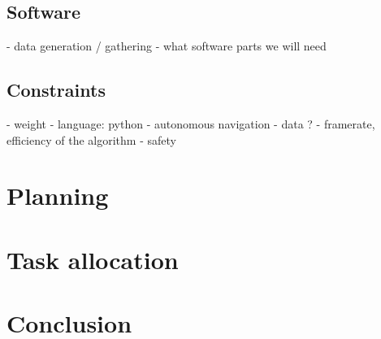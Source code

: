 \documentclass[12pt]{article}
\begin{document}
\subsection{Software}
- data generation / gathering
- what software parts we will need

\subsection{Constraints}
- weight
- language: python
- autonomous navigation
- data ?
- framerate, efficiency of the algorithm
- safety

\section {Planning}

\section {Task allocation}

\section {Conclusion}
\end{document}
